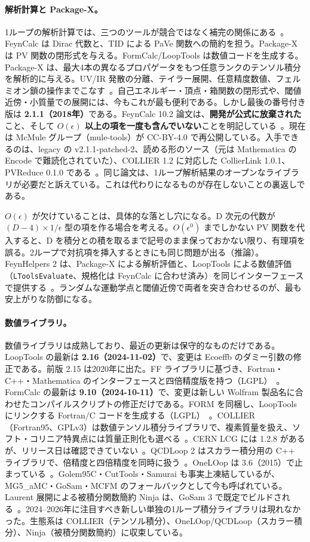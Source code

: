 \documentclass[a4paper,10pt]{ltjsarticle}
\begin{document}
\paragraph{解析計算と Package-X。}1ループの解析計算では、三つのツールが競合ではなく補完の関係にある~\cite{r10}。FeynCalc は Dirac 代数と、TID による PaVe 関数への簡約を担う。Package-X は PV 関数の閉形式を与える。FormCalc/LoopTools は数値コードを生成する。Package-X は、最大4本の異なるプロパゲータをもつ任意ランクのテンソル積分を解析的に与える。UV/IR 発散の分離、テイラー展開、任意精度数値、フェルミオン鎖の操作までこなす~\cite{r42}。自己エネルギー・頂点・箱関数の閉形式や、閾値近傍・小質量での展開には、今もこれが最も便利である。しかし最後の番号付き版は \textbf{2.1.1（2018年）}である。FeynCalc 10.2 論文は、\textbf{開発が公式に放棄された}こと、そして \textbf{$O(\epsilon)$ 以上の項を一度も含んでいない}ことを明記している~\cite{r10}。現在は McMule グループ（mule-tools）が CC-BY-4.0 で再公開している。入手できるのは、legacy の v2.1.1-patched-2、読める形のソース（元は Mathematica の Encode で難読化されていた）、COLLIER 1.2 に対応した CollierLink 1.0.1、PVReduce 0.1.0 である~\cite{r43}。同じ論文は、1ループ解析結果のオープンなライブラリが必要だと訴えている。これは代わりになるものが存在しないことの裏返しである。

$O(\epsilon)$ が欠けていることは、具体的な落とし穴になる。D 次元の代数が $(D-4)\times 1/\epsilon$ 型の項を作る場合を考える。$O(\epsilon^0)$ までしかない PV 関数を代入すると、D を積分との積を取るまで記号のまま保っておかない限り、有理項を誤る。2ループで対抗項を挿入するときにも同じ問題が出る（推論）。FeynHelpers 2 は、Package-X による解析評価と、LoopTools による数値評価（\texttt{LToolsEvaluate}、規格化は FeynCalc に合わせ済み）を同じインターフェースで提供する~\cite{r10}。ランダムな運動学点と閾値近傍で両者を突き合わせるのが、最も安上がりな防御になる。

\paragraph{数値ライブラリ。}数値ライブラリは成熟しており、最近の更新は保守的なものだけである。LoopTools の最新は \textbf{2.16（2024-11-02）}で、変更は Ecoeffb のダミー引数の修正である。前版 2.15 は2020年に出た。FF ライブラリに基づき、Fortran・C++・Mathematica のインターフェースと四倍精度版を持つ（LGPL）~\cite{r44}。FormCalc の最新は \textbf{9.10（2024-10-11）}で、変更は新しい Wolfram 製品名に合わせたコンパイルスクリプトの修正だけである。FORM を同梱し、LoopTools にリンクする Fortran/C コードを生成する（LGPL）~\cite{r45}。COLLIER（Fortran95、GPLv3）は数値テンソル積分ライブラリで、複素質量を扱え、ソフト・コリニア特異点には質量正則化も選べる~\cite{r46}。CERN LCG には 1.2.8 があるが、リリース日は確認できていない~\cite{r47}。QCDLoop 2 はスカラー積分用の C++ ライブラリで、倍精度と四倍精度を同時に扱う~\cite{r48}。OneLOop は 3.6（2015）で止まっている~\cite{r49}。Golem95C・CutTools・Samurai も事実上凍結しているが、MG5\_aMC・GoSam・MCFM のフォールバックとして今も呼ばれている。Laurent 展開による被積分関数簡約 Ninja は、GoSam 3 で既定でビルドされる~\cite{r50}。2024--2026年に注目すべき新しい単独の1ループ積分ライブラリは現れなかった。生態系は COLLIER（テンソル積分）、OneLOop/QCDLoop（スカラー積分）、Ninja（被積分関数簡約）に収束している。
\end{document}
